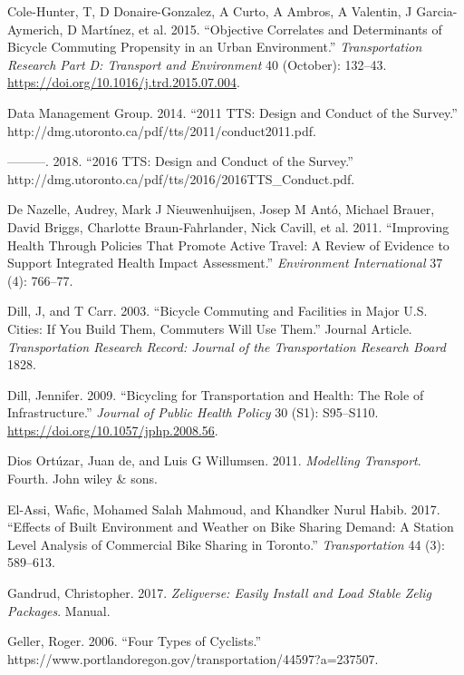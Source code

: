 \documentclass[smallextended]{svjour3}       %
\begin{document}
\leavevmode\hypertarget{ref-ColeHunter2015}{}%
Cole-Hunter, T, D Donaire-Gonzalez, A Curto, A Ambros, A Valentin, J
Garcia-Aymerich, D Martínez, et al. 2015. ``Objective Correlates and
Determinants of Bicycle Commuting Propensity in an Urban Environment.''
\emph{Transportation Research Part D: Transport and Environment} 40
(October): 132--43. \url{https://doi.org/10.1016/j.trd.2015.07.004}.

\leavevmode\hypertarget{ref-Dmg2014tts}{}%
Data Management Group. 2014. ``2011 TTS: Design and Conduct of the
Survey.'' http://dmg.utoronto.ca/pdf/tts/2011/conduct2011.pdf.

\leavevmode\hypertarget{ref-Dmg2018tts}{}%
---------. 2018. ``2016 TTS: Design and Conduct of the Survey.''
http://dmg.utoronto.ca/pdf/tts/2016/2016TTS\_Conduct.pdf.

\leavevmode\hypertarget{ref-deNazelle2011}{}%
De Nazelle, Audrey, Mark J Nieuwenhuijsen, Josep M Antó, Michael Brauer,
David Briggs, Charlotte Braun-Fahrlander, Nick Cavill, et al. 2011.
``Improving Health Through Policies That Promote Active Travel: A Review
of Evidence to Support Integrated Health Impact Assessment.''
\emph{Environment International} 37 (4): 766--77.

\leavevmode\hypertarget{ref-Dill2003}{}%
Dill, J, and T Carr. 2003. ``Bicycle Commuting and Facilities in Major
U.S. Cities: If You Build Them, Commuters Will Use Them.'' Journal
Article. \emph{Transportation Research Record: Journal of the
Transportation Research Board} 1828.

\leavevmode\hypertarget{ref-Dill2009}{}%
Dill, Jennifer. 2009. ``Bicycling for Transportation and Health: The
Role of Infrastructure.'' \emph{Journal of Public Health Policy} 30
(S1): S95--S110. \url{https://doi.org/10.1057/jphp.2008.56}.

\leavevmode\hypertarget{ref-deDios2011Modelling}{}%
Dios Ortúzar, Juan de, and Luis G Willumsen. 2011. \emph{Modelling
Transport}. Fourth. John wiley \& sons.

\leavevmode\hypertarget{ref-elAssi2017effects}{}%
El-Assi, Wafic, Mohamed Salah Mahmoud, and Khandker Nurul Habib. 2017.
``Effects of Built Environment and Weather on Bike Sharing Demand: A
Station Level Analysis of Commercial Bike Sharing in Toronto.''
\emph{Transportation} 44 (3): 589--613.

\leavevmode\hypertarget{ref-Gandrud2017}{}%
Gandrud, Christopher. 2017. \emph{Zeligverse: Easily Install and Load
Stable Zelig Packages}. Manual.

\leavevmode\hypertarget{ref-Geller2006}{}%
Geller, Roger. 2006. ``Four Types of Cyclists.''
https://www.portlandoregon.gov/transportation/44597?a=237507.
\end{document}

